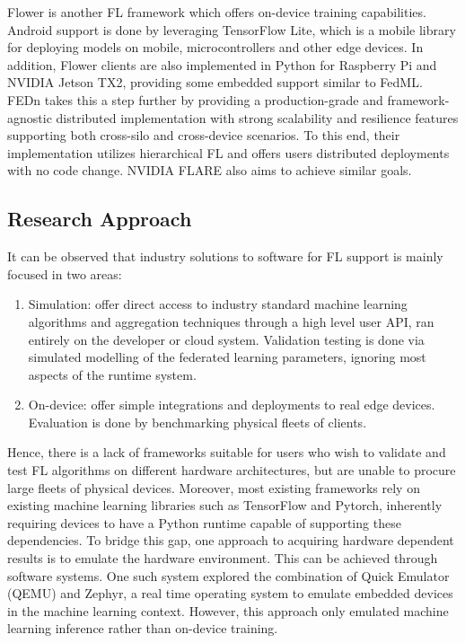 \documentclass[12pt]{article}
\begin{document}
Flower\cite{beutel2020flower} is another FL framework which offers on-device training capabilities. Android support
is done by leveraging TensorFlow Lite\cite{tflite}, which is a mobile library for deploying models on mobile, microcontrollers and other edge devices.
In addition, Flower clients are also implemented in Python for Raspberry Pi and NVIDIA Jetson TX2,
providing some embedded support similar to FedML.\\

FEDn\cite{ekmefjord2021scalable} takes this a step further by providing a production-grade and framework-
agnostic distributed implementation with strong scalability and resilience features supporting both cross-silo and
cross-device scenarios. To this end, their implementation utilizes hierarchical FL\cite{rana_2023_hierarchical} and
offers users distributed deployments with no code change. NVIDIA FLARE\cite{flare} also aims to achieve
similar goals.

\subsection{Research Approach}
It can be observed that industry solutions to software for FL support is mainly focused in two
areas:
\begin{enumerate}
  \item Simulation: offer direct access to industry standard machine learning algorithms and aggregation
    techniques through a high level user API, ran entirely on the developer or cloud system. Validation testing is done via simulated
    modelling of the federated learning parameters, ignoring most aspects of the runtime system.
  \item On-device: offer simple integrations and deployments to real edge devices. Evaluation is
    done by benchmarking physical fleets of clients.
\end{enumerate}
Hence, there is a lack of frameworks suitable for users who wish to validate and test FL algorithms on different hardware
architectures, but are unable to procure large fleets of physical devices. Moreover, most existing
frameworks rely on existing machine learning libraries such as TensorFlow and Pytorch, inherently
requiring devices to have a Python runtime capable of supporting these dependencies. To bridge this gap,
one approach to acquiring hardware dependent results is to emulate the hardware environment. This
can be achieved through software systems. One such system explored the combination of Quick Emulator (QEMU)
and Zephyr, a real time operating system to emulate embedded devices in the machine learning context\cite{ntu}. However,
this approach only emulated machine learning inference rather than on-device training.\\
\end{document}
